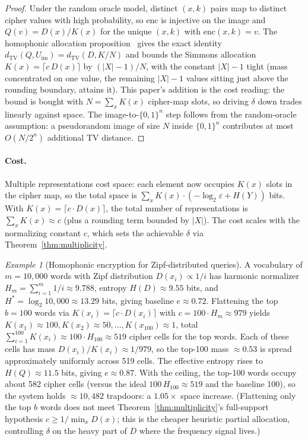 \documentclass[11pt]{article}
\theoremstyle{definition}
\theoremstyle{plain}
\theoremstyle{remark}
\newtheorem{example}{Example}[section]
\newcommand{\enc}{\mathrm{enc}}
\newcommand{\TV}{d_{\mathrm{TV}}}
\newcommand{\B}{\{0,1\}}
\begin{document}
\begin{proof}
Under the random oracle model, distinct $(x, k)$ pairs map to distinct
cipher values with high probability, so $\enc$ is injective on the
image and $Q(v) = D(x)/K(x)$ for the unique $(x, k)$ with
$\enc(x, k) = v$.  The homophonic allocation
proposition~\cite[Prop.~4.1]{towell2026cipher} gives the exact
identity $\TV(Q, U_{\mathrm{im}}) = \TV(D, K/N)$ and bounds the Simmons
allocation $K(x) = \lceil c\,D(x) \rceil$ by $(|X|-1)/N$, with the
constant $|X|-1$ tight (mass concentrated on one value, the remaining
$|X|-1$ values sitting just above the rounding boundary, attains it).
This paper's addition is the cost reading: the bound is bought with
$N = \sum_x K(x)$ cipher-map slots, so driving $\delta$ down trades
linearly against space.  The image-to-$\B^n$ step follows from the
random-oracle assumption: a pseudorandom image of size $N$ inside
$\B^n$ contributes at most $O(N / 2^n)$ additional TV distance.
\end{proof}

\paragraph{Cost.}
Multiple representations cost space: each element now occupies $K(x)$
slots in the cipher map, so the total space is
$\sum_x K(x) \cdot (-\log_2 \varepsilon + H(Y))$ bits.  With
$K(x) = \lceil c \cdot D(x) \rceil$, the total number of
representations is $\sum_x K(x) \approx c$ (plus a rounding term bounded
by $|X|$).  The cost scales with the normalizing constant $c$, which
sets the achievable $\delta$ via Theorem~\ref{thm:multiplicity}.

\begin{example}[Homophonic encryption for Zipf-distributed queries]
\label{ex:homophonic}
A vocabulary of $m = 10{,}000$ words with Zipf distribution
$D(x_i) \propto 1/i$ has harmonic normalizer
$H_m = \sum_{i=1}^m 1/i \approx 9.788$, entropy
$H(D) \approx 9.55$ bits, and $H^* = \log_2 10{,}000 \approx 13.29$
bits, giving baseline $e \approx 0.72$.  Flattening the top
$b = 100$ words via $K(x_i) = \lceil c \cdot D(x_i) \rceil$ with
$c = 100 \cdot H_m \approx 979$ yields
$K(x_1) \approx 100, K(x_2) \approx 50, \ldots, K(x_{100}) \approx 1$,
total $\sum_{i=1}^{100} K(x_i) \approx 100 \cdot H_{100} \approx 519$
cipher cells for the top words.  Each of these cells has mass
$D(x_i)/K(x_i) \approx 1/979$, so the top-100 mass $\approx 0.53$ is
spread approximately uniformly across 519 cells.  The effective
entropy rises to $H(Q) \approx 11.5$ bits, giving $e \approx 0.87$.
With the ceiling, the top-100 words occupy about 582 cipher cells (versus
the ideal $100\,H_{100} \approx 519$ and the baseline 100), so the system
holds $\approx 10{,}482$ trapdoors: a $1.05\times$ space increase.
(Flattening only the top $b$ words does not meet
Theorem~\ref{thm:multiplicity}'s full-support hypothesis
$c \geq 1/\min_x D(x)$; this is the cheaper heuristic partial allocation,
controlling $\delta$ on the heavy part of $D$ where the frequency signal
lives.)
\end{example}
\end{document}
